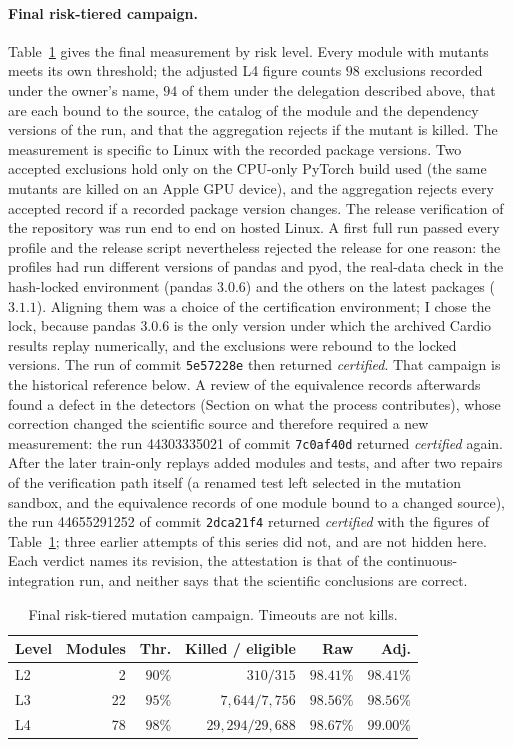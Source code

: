 \documentclass[conference]{IEEEtran}
\begin{document}
\paragraph{Final risk-tiered campaign.}
Table~\ref{tab:closure} gives the final measurement by risk level. Every module with mutants meets its own threshold;
the adjusted L4 figure counts $98$ exclusions recorded under the owner's name, $94$ of them under the delegation described above, that are each bound to the source, the catalog of
the module and the dependency versions of the run, and that the aggregation rejects if the mutant is killed. The
measurement is specific to Linux with the recorded package versions. Two accepted exclusions hold only on the
CPU-only PyTorch build used (the same mutants are killed on an Apple GPU device), and the aggregation rejects every
accepted record if a recorded package version changes.
The release verification of the repository was run end to end on hosted Linux. A first full run passed every profile and the release script nevertheless rejected
the release for one reason: the profiles had run different versions of pandas and pyod, the real-data check in the hash-locked environment (pandas $3.0.6$) and the
others on the latest packages ($3.1.1$). Aligning them was a choice of the certification environment; I chose the lock, because pandas $3.0.6$ is the only version under which
the archived Cardio results replay numerically, and the exclusions were rebound to the locked versions. The run of commit \texttt{5e57228e} then returned \emph{certified}.
That campaign is the historical reference below. A review of the equivalence records afterwards found a defect in the detectors (Section on what the process contributes), whose correction
changed the scientific source and therefore required a new measurement: the run 44303335021 of commit \texttt{7c0af40d} returned \emph{certified} again. After the later train-only replays added modules and tests, and after two repairs of the verification path itself (a renamed test left selected in the mutation sandbox, and the equivalence records of one module bound to a changed source), the run 44655291252 of commit \texttt{2dca21f4} returned \emph{certified} with the figures of Table~\ref{tab:closure}; three earlier attempts of this series did not, and are not hidden here. Each verdict names its revision, the attestation is that of the
continuous-integration run, and neither says that the scientific conclusions are correct.

\begin{table}[t]
\centering
\caption{Final risk-tiered mutation campaign. Timeouts are not kills.}
\label{tab:closure}
\small\setlength{\tabcolsep}{3.5pt}
\begin{tabular}{lrrrrr}
\toprule
Level & Modules & Thr. & Killed / eligible & Raw & Adj. \\
\midrule
L2 & 2 & $90\%$ & $310 / 315$ & $98.41\%$ & $98.41\%$ \\
L3 & 22 & $95\%$ & $7{,}644 / 7{,}756$ & $98.56\%$ & $98.56\%$ \\
L4 & 78 & $98\%$ & $29{,}294 / 29{,}688$ & $98.67\%$ & $99.00\%$ \\
\bottomrule
\end{tabular}
\end{table}
\end{document}
